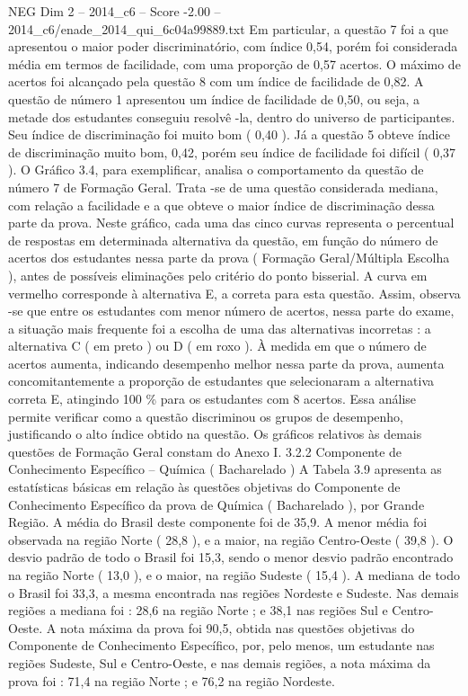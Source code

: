 \begin{textsample}{NEG Dim 2 – 2014\_c6 – Score -2.00 – 2014\_c6/enade\_2014\_qui\_6c04a99889.txt}
Em particular, a questão 7 foi a que apresentou o maior poder discriminatório, com índice 0,54, porém foi considerada média em termos de facilidade, com uma proporção de 0,57 acertos.
O máximo de acertos foi alcançado pela questão 8 com um índice de facilidade de 0,82.
A questão de número 1 apresentou um índice de facilidade de 0,50, ou seja, a metade dos estudantes conseguiu resolvê -la, dentro do universo de participantes.
Seu índice de discriminação foi muito bom ( 0,40 ).
Já a questão 5 obteve índice de discriminação muito bom, 0,42, porém seu índice de facilidade foi difícil ( 0,37 ).
O Gráfico 3.4, para exemplificar, analisa o comportamento da questão de número 7 de Formação Geral.
Trata -se de uma questão considerada mediana, com relação a facilidade e a que obteve o maior índice de discriminação dessa parte da prova.
Neste gráfico, cada uma das cinco curvas representa o percentual de respostas em determinada alternativa da questão, em função do número de acertos dos estudantes nessa parte da prova ( Formação Geral/Múltipla Escolha ), antes de possíveis eliminações pelo critério do ponto bisserial.
A curva em vermelho corresponde à alternativa E, a correta para esta questão.
Assim, observa -se que entre os estudantes com menor número de acertos, nessa parte do exame, a situação mais frequente foi a escolha de uma das alternativas incorretas : a alternativa C ( em preto ) ou D ( em roxo ).
À medida em que o número de acertos aumenta, indicando desempenho melhor nessa parte da prova, aumenta concomitantemente a proporção de estudantes que selecionaram a alternativa correta E, atingindo 100 \% para os estudantes com 8 acertos.
Essa análise permite verificar como a questão discriminou os grupos de desempenho, justificando o alto índice obtido na questão.
Os gráficos relativos às demais questões de Formação Geral constam do Anexo I. 3.2.2 Componente de Conhecimento Específico – Química ( Bacharelado ) A Tabela 3.9 apresenta as estatísticas básicas em relação às questões objetivas do Componente de Conhecimento Específico da prova de Química ( Bacharelado ), por Grande Região.
A média do Brasil deste componente foi de 35,9.
A menor média foi observada na região Norte ( 28,8 ), e a maior, na região Centro-Oeste ( 39,8 ).
O desvio padrão de todo o Brasil foi 15,3, sendo o menor desvio padrão encontrado na região Norte ( 13,0 ), e o maior, na região Sudeste ( 15,4 ).
A mediana de todo o Brasil foi 33,3, a mesma encontrada nas regiões Nordeste e Sudeste.
Nas demais regiões a mediana foi : 28,6 na região Norte ; e 38,1 nas regiões Sul e Centro-Oeste.
A nota máxima da prova foi 90,5, obtida nas questões objetivas do Componente de Conhecimento Específico, por, pelo menos, um estudante nas regiões Sudeste, Sul e Centro-Oeste, e nas demais regiões, a nota máxima da prova foi : 71,4 na região Norte ; e 76,2 na região Nordeste.

\end{textsample}

